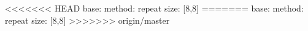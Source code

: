 <<<<<<< HEAD
base:
  method: repeat
  size: [8,8]
=======
base:
  method: repeat
  size: [8,8]
>>>>>>> origin/master
